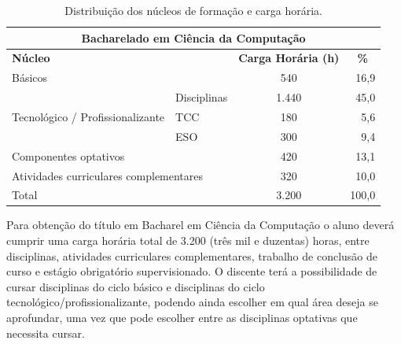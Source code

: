 \documentclass[
	12pt,				%
	openright,			%
  oneside,     %
	a4paper,			%
	chapter=TITLE,		%
	english,			%
	french,				%
	spanish,			%
	brazil				%
	]{abntex2}
\begin{document}
  \begin{center}
    
    \begin{scriptsize}
      \begin{longtable}{p{4cm}p{1.5cm}p{2cm}p{3cm}}
        \caption{\label{quadro:distribuicao-nucleos-formacao-e-ch}Distribuição dos núcleos de formação e carga horária.}\\
      \toprule
      \multicolumn{4}{c}{\textbf{Bacharelado em Ciência da Computação}}\\ \midrule
      \multicolumn{2}{l}{\textbf{Núcleo}} & \multicolumn{1}{c}{\textbf{Carga Horária (h)}} & \multicolumn{1}{c}{\textbf{\%}}\\
      \midrule
      Básicos & & \multicolumn{1}{c}{540} & \multicolumn{1}{r}{16,9}\\ \midrule
      \multirow{3}{3cm}{Tecnológico / Profissionalizante} & Disciplinas & \multicolumn{1}{c}{1.440} & \multicolumn{1}{r}{45,0}\\ \cline{2-4}
      & TCC & \multicolumn{1}{c}{180} & \multicolumn{1}{r}{5,6}\\ \cline{2-4}
      & ESO & \multicolumn{1}{c}{300} & \multicolumn{1}{r}{9,4}\\ \midrule
      \multicolumn{2}{l}{Componentes optativos} & \multicolumn{1}{c}{420} & \multicolumn{1}{r}{13,1}\\ \midrule
      \multicolumn{2}{l}{Atividades curriculares complementares} & \multicolumn{1}{c}{320} & \multicolumn{1}{r}{10,0}\\ \midrule
      \multicolumn{2}{l}{Total} & \multicolumn{1}{c}{3.200} & \multicolumn{1}{r}{100,0}\\
  \bottomrule
  \end{longtable}
  \end{scriptsize}      
  \end{center}
  
  Para obtenção do título em Bacharel em Ciência da Computação o aluno deverá cumprir uma carga horária total de 3.200 (três mil e duzentas) horas, entre disciplinas, atividades curriculares complementares, trabalho de conclusão de curso e estágio obrigatório supervisionado. O discente terá a possibilidade de cursar disciplinas do ciclo básico e disciplinas do ciclo tecnológico/profissionalizante, podendo ainda escolher em qual área deseja se aprofundar, uma vez que pode escolher entre as disciplinas optativas que necessita cursar.
  
\end{document}
